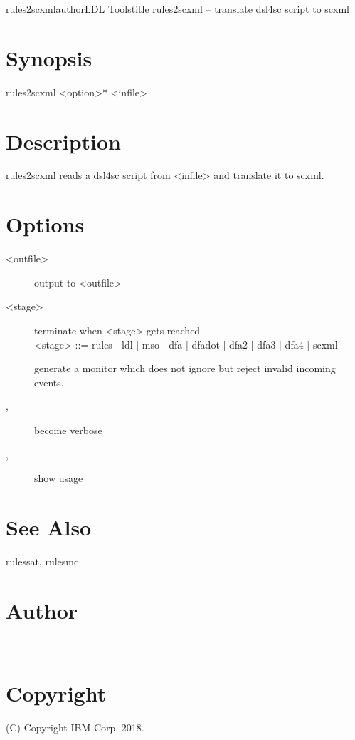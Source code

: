 \documentclass[fancy]{article}
\begin{document}
\begin{Name}{1}{rules2scxml}{author}{LDL Tools}{title}
rules2scxml -- translate dsl4sc script to scxml
\end{Name}

\section{Synopsis}
rules2scxml <option>* <infile>

\section{Description}
rules2scxml reads a dsl4sc script from <infile> and translate it to scxml.

\section{Options}
\begin{description}
\item[ <outfile>]
output to <outfile>
%
\item[ <stage>]
terminate when <stage> gets reached\\
<stage> ::= rules | ldl | mso | dfa | dfadot | dfa2 | dfa3 | dfa4 | scxml
%
\item[]
generate a monitor which does not ignore but reject invalid incoming events.
%
\item[, ]
become verbose
%
\item[, ]
show usage
\end{description}

\section{See Also}
rulessat, rulesmc

\section{Author}
\\

\section{Copyright}
(C) Copyright IBM Corp. 2018.
\end{document}
